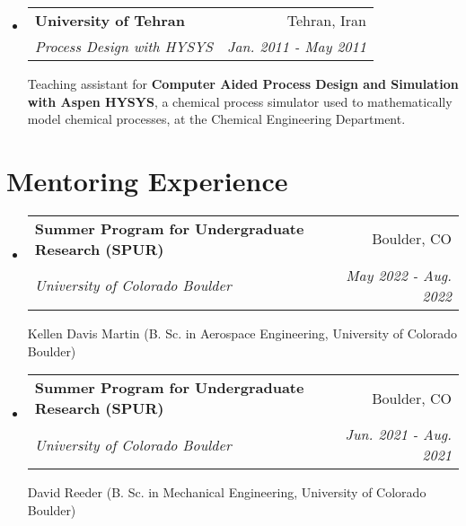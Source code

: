 \documentclass[letterpaper,11pt]{article}
\makeatletter
\newcommand{\resumeSubheading}[4]{
  \vspace{-1pt}\item
    \begin{tabular*}{0.97\textwidth}{l@{\extracolsep{\fill}}r}
      \textbf{#1} & #2 \\
      \textit{\small#3} & \textit{\small #4} \\
    \end{tabular*}\vspace{-5pt}
}
\newcommand{\resumeSubHeadingListStart}{\begin{itemize}[leftmargin=*]}
\newcommand{\resumeSubHeadingListEnd}{\end{itemize}}
\makeatother
\begin{document}
\resumeSubHeadingListStart
  \resumeSubheading
    {University of Tehran}{Tehran, Iran}
    {Process Design with HYSYS}{Jan. 2011 - May 2011}
    \vspace{.1 mm}
    
    Teaching assistant for \textbf{Computer Aided Process Design and Simulation with Aspen HYSYS}, a chemical process simulator used to mathematically model chemical processes, at the Chemical Engineering Department.

\resumeSubHeadingListEnd

\section{Mentoring Experience}

\resumeSubHeadingListStart

  \resumeSubheading
    {Summer Program for Undergraduate Research (SPUR)}{Boulder, CO}
    {University of Colorado Boulder}{May 2022 - Aug. 2022}
    \vspace{.1 mm}
    
    Kellen Davis Martin (B. Sc. in Aerospace Engineering, University of Colorado Boulder)
    
  \resumeSubheading
    {Summer Program for Undergraduate Research (SPUR)}{Boulder, CO}
    {University of Colorado Boulder}{Jun. 2021 - Aug. 2021}
    \vspace{.1 mm}
    
    David Reeder (B. Sc. in Mechanical Engineering, University of Colorado Boulder)

\resumeSubHeadingListEnd

\end{document}
